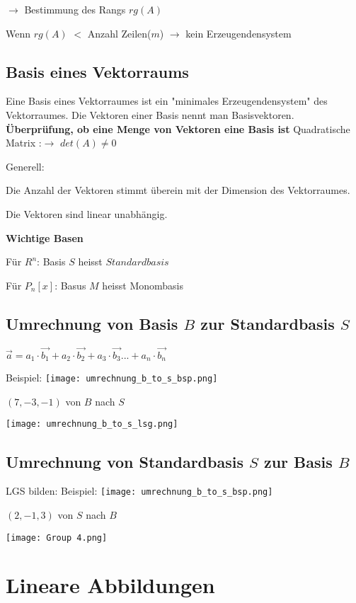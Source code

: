 \begin{multicols*}{3}
    {$\rightarrow$ Bestimmung des Rangs $rg(A)$}

    {Wenn $rg(A)$ $<$ Anzahl Zeilen($m$) $\rightarrow$ kein Erzeugendensystem}


    \subsection{Basis eines Vektorraums}
    {Eine Basis eines Vektorraumes ist ein "minimales Erzeugendensystem" des Vektorraumes. Die Vektoren einer Basis nennt man Basisvektoren.}
    {\textbf{Überprüfung, ob eine Menge von Vektoren eine Basis ist}}
    {Quadratische Matrix :$\rightarrow$ $det(A) \neq 0$}

    {Generell:}

    { Die Anzahl der Vektoren stimmt überein mit der Dimension des Vektorraumes.}

    { Die Vektoren sind linear unabhängig.}

    {\textbf{Wichtige Basen}}

    {Für $R^n$: Basis $S$ heisst $Standardbasis$ }

    {Für $P_n[x]$: Basus $M$ heisst Monombasis}
    \WhiteSpace
    
    \vfill\null
    \columnbreak
    \subsection{Umrechnung von Basis $B$ zur Standardbasis $S$}
    {$\vec{a} = a_1 \cdot \vec{b_1} + a_2 \cdot \vec{b_2} + a_3 \cdot \vec{b_3} ... + a_n \cdot \vec{b_n}$}

    {Beispiel:}
    {\texttt{[image: umrechnung\_b\_to\_s\_bsp.png]}}

    {$(7,-3,-1)$ von $B$ nach $S$}

    {\texttt{[image: umrechnung\_b\_to\_s\_lsg.png]}}

    \subsection{Umrechnung von Standardbasis $S$ zur Basis $B$}
    {LGS bilden:}
    {Beispiel:}
    {\texttt{[image: umrechnung\_b\_to\_s\_bsp.png]}}

    {$(2,-1,3)$ von $S$ nach $B$}

    {\texttt{[image: Group 4.png]}}
    \vfill\null
    \columnbreak
    \section{Lineare Abbildungen}

\end{multicols*}

